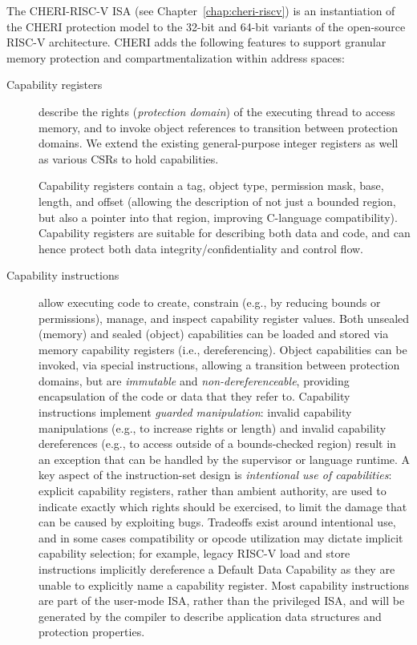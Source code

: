 
The CHERI-RISC-V ISA (see Chapter~\ref{chap:cheri-riscv}) is an instantiation of
the CHERI protection model to the 32-bit and 64-bit variants of the open-source RISC-V architecture.
CHERI adds the following features to support granular memory protection
and compartmentalization within address spaces:


\begin{description}
\item[Capability registers] describe the rights ({\em protection domain}) of
the executing thread to
access memory, and to invoke object references
to transition between protection domains.
We extend the existing general-purpose integer registers as well as
various CSRs to hold capabilities.

Capability registers contain a tag, object type, permission mask, base, length, and offset (allowing the description of not just a bounded region, but also a pointer into that region, improving C-language compatibility).
Capability registers are suitable for describing both data and code, and can hence protect both data integrity/confidentiality and control flow.

\item[Capability instructions] allow executing code to create, constrain (e.g., by reducing bounds or permissions), manage, and inspect capability register values.  Both unsealed (memory) and sealed (object) capabilities can be loaded and stored via memory capability registers (i.e., dereferencing).
Object capabilities can be invoked, via special instructions, allowing a transition between protection domains, but are {\em immutable} and {\em non-dereferenceable}, providing encapsulation of the code or data that they refer to.
  Capability instructions implement {\em guarded manipulation}: invalid capability manipulations (e.g., to increase rights or length) and invalid capability dereferences (e.g., to access outside of a bounds-checked region) result in an exception that can be handled by the supervisor or language runtime.
A key aspect of the instruction-set design is \textit{intentional use of
  capabilities}: explicit capability registers, rather than ambient
authority, are used to indicate exactly which rights should be exercised, to
limit the damage that can be caused by exploiting bugs.
Tradeoffs exist around intentional use, and in some cases compatibility or
opcode utilization may dictate implicit capability selection; for example,
legacy RISC-V load and store instructions implicitly dereference a Default
Data Capability as they are unable to explicitly name a capability register.
Most capability instructions are part of the user-mode ISA, rather than the privileged ISA, and will be generated by the compiler to describe application data structures and protection properties.


\end{description}
